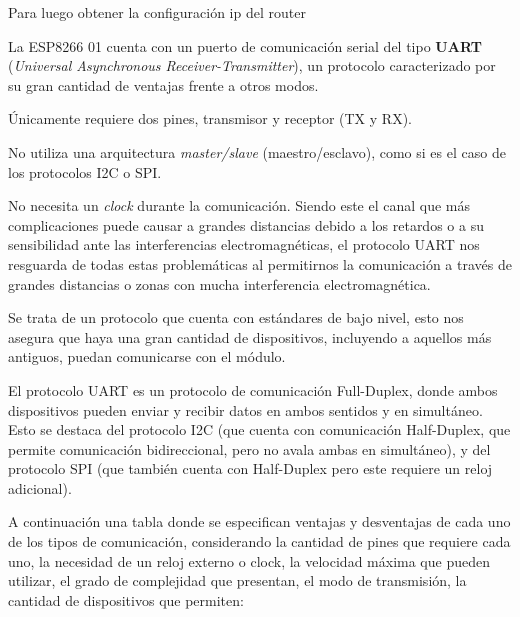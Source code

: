                 \par
                
                Para luego obtener la configuración ip del router\par

                \par
                
                La ESP8266 01 cuenta con un puerto de comunicación serial del tipo \textbf{UART} (\textit{Universal Asynchronous Receiver-Transmitter}), un protocolo caracterizado por su gran cantidad de ventajas frente a otros modos.\par
                Únicamente requiere dos pines, transmisor y receptor (TX y RX).\par
                No utiliza una arquitectura \textit{master/slave} (maestro/esclavo), como si es el caso de los protocolos I2C o SPI.\par
                No necesita un \textit{clock} durante la comunicación. Siendo este el canal que más complicaciones puede causar a grandes distancias debido a los retardos o a su sensibilidad ante las interferencias electromagnéticas, el protocolo UART nos resguarda de todas estas problemáticas al permitirnos la comunicación a través de grandes distancias o zonas con mucha interferencia electromagnética.\par
                Se trata de un protocolo que cuenta con estándares de bajo nivel, esto nos asegura que haya una gran cantidad de dispositivos, incluyendo a aquellos más antiguos, puedan comunicarse con el módulo.\par
                El protocolo UART es un protocolo de comunicación Full-Duplex, donde ambos dispositivos pueden enviar y recibir datos en ambos sentidos y en simultáneo. Esto se destaca del protocolo I2C (que cuenta con comunicación Half-Duplex, que permite comunicación bidireccional, pero no avala ambas en simultáneo), y del protocolo SPI (que también cuenta con Half-Duplex pero este requiere un reloj adicional).\par
                A continuación una tabla donde se especifican ventajas y desventajas de cada uno de los tipos de comunicación, considerando la cantidad de pines que requiere cada uno, la necesidad de un reloj externo o clock, la velocidad máxima que pueden utilizar, el grado de complejidad que presentan, el modo de transmisión, la cantidad de dispositivos que permiten:\par


